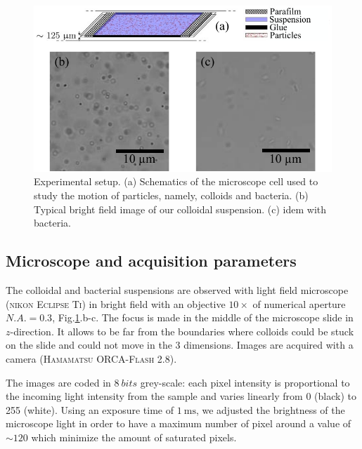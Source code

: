 \documentclass[prb,reprint,amsmath,amssymb]{revtex4-1}
\newcommand{\tg}[1]{{\color{magenta}#1}} %
\begin{document}
\begin{figure}
\includegraphics[width=\linewidth]{Lamelle_Photos.pdf}
\caption{Experimental setup. (a) Schematics of the microscope cell used to study the motion of particles, namely, colloids and bacteria. (b) Typical bright field image of our colloidal suspension. (c) idem with bacteria.}
\label{Slide}
\end{figure}

\subsection{Microscope and acquisition parameters}

The colloidal and bacterial suspensions are observed with light field microscope\cite{Mignard2015} (\textsc{nikon Eclipse Ti}) in \tg{bright field} with an objective $10 \times$ of numerical aperture $N.A. = 0.3$, Fig.\ref{Slide}.b-c. The focus is made in the middle of the microscope slide in $z$-direction. It allows to be far from the boundaries where colloids could be stuck on the slide and could not move in the 3 dimensions. Images are acquired with a camera (\textsc{Hamamatsu ORCA-Flash 2.8}).



The images are coded in $\SI{8}{bits}$  grey-scale: each pixel intensity is proportional to the incoming light intensity from the sample and varies linearly from  0 (black) to 255 (white). Using an exposure time of $\SI{1}{\milli\second}$, we adjusted the brightness of the microscope light in order to have a maximum number of pixel around a value of $\sim 120$ which minimize the amount of saturated pixels.
\end{document}

